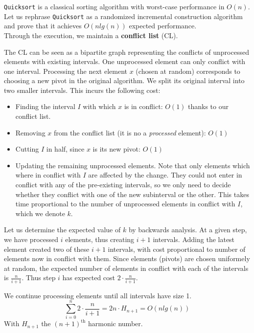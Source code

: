 
\texttt{Quicksort} is a classical sorting algorithm with worst-case performance in $O(n)$. Let us rephrase \texttt{Quicksort} as a randomized incremental construction algorithm and prove that it achieves $O(n lg(n))$ expected performance.\\

Through the execution, we maintain a \textbf{conflict list} (CL).

The CL can be seen as a bipartite graph representing the conflicts of unprocessed elements with existing intervals. One unprocessed element can only conflict with one interval.
Processing the next element $x$ (chosen at random) corresponds to choosing a new pivot in the original algorithm. We split its original interval into two smaller intervals. This incurs the following cost:
\begin{itemize}
  \item Finding the interval $I$ with which $x$ is in conflict: $O(1)$ thanks to our conflict list.
  \item Removing $x$ from the conflict list (it is no a \textit{processed} element): $O(1)$
  \item Cutting $I$ in half, since $x$ is its new pivot: $O(1)$
  \item Updating the remaining unprocessed elements. Note that only elements which where in conflict with $I$ are affected by the change. They could not enter in conflict with any of the pre-existing intervals, so we only need to decide whether they conflict with one of the new subinterval or the other. This takes time proportional to the number of unprocessed elements in conflict with $I$, which we denote $k$.
\end{itemize}

Let us determine the expected value of $k$ by backwards analysis. At a given step, we have processed $i$ elements, thus creating $i+1$ intervals. Adding the latest element created two of these $i+1$ intervals, with cost proportional to number of elements now in conflict with them. Since elements (pivots) are chosen uniformely at random, the expected number of elements in conflict with each of the intervals is $\frac{n}{i+1}$. Thus step $i$ has expected cost $2 \cdot \frac{n}{i+1}$.

We continue processing elements until all intervals have size 1.
\[
  \sum_{i=0}^n {2 \cdot \frac{n}{i+1}} = 2n \cdot H_{n+1} = O(n lg(n))
\]
With $H_{n+1}$ the $(n+1)^\text{th}$ harmonic number.
